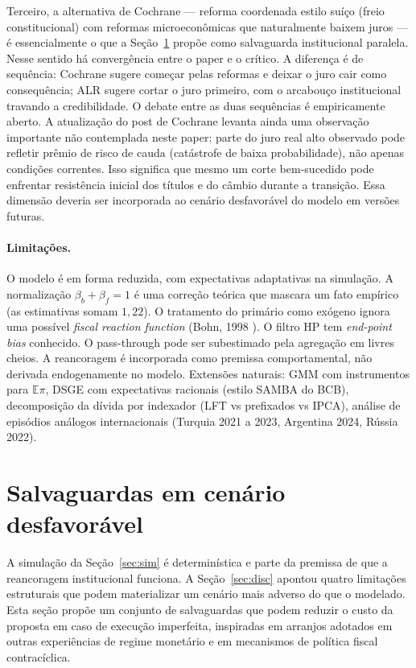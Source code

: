 \documentclass[11pt,a4paper]{article}
\begin{document}
Terceiro, a alternativa de Cochrane — reforma coordenada estilo suíço
(freio constitucional) com reformas microeconômicas que naturalmente
baixem juros — é essencialmente o que a Seção~\ref{sec:salvaguardas}
propõe como salvaguarda institucional paralela. Nesse sentido há
convergência entre o paper e o crítico. A diferença é de sequência:
Cochrane sugere começar pelas reformas e deixar o juro cair como
consequência; ALR sugere cortar o juro primeiro, com o arcabouço
institucional travando a credibilidade. O debate entre as duas
sequências é empiricamente aberto. A atualização do post de Cochrane
levanta ainda uma observação importante não contemplada neste paper:
parte do juro real alto observado pode refletir prêmio de risco de
cauda (catástrofe de baixa probabilidade), não apenas condições
correntes. Isso significa que mesmo um corte bem-sucedido pode enfrentar
resistência inicial dos títulos e do câmbio durante a transição. Essa
dimensão deveria ser incorporada ao cenário desfavorável do modelo em
versões futuras.

\paragraph{Limitações.} O modelo é em forma reduzida, com expectativas
adaptativas na simulação. A normalização $\beta_b + \beta_f = 1$ é
uma correção teórica que mascara um fato empírico (as estimativas somam
$1{,}22$). O tratamento do primário como exógeno ignora uma possível
\emph{fiscal reaction function} (Bohn, 1998 \cite{bohn1998}). O filtro
HP tem \emph{end-point bias} conhecido. O pass-through pode ser
subestimado pela agregação em livres cheios. A reancoragem é incorporada
como premissa comportamental, não derivada endogenamente no modelo.
Extensões naturais: GMM com instrumentos para
$\mathbb{E}\pi$, DSGE com expectativas racionais (estilo SAMBA do BCB),
decomposição da dívida por indexador (LFT vs prefixados vs IPCA),
análise de episódios análogos internacionais (Turquia 2021 a 2023, Argentina
2024, Rússia 2022).

\section{Salvaguardas em cenário desfavorável}\label{sec:salvaguardas}

A simulação da Seção~\ref{sec:sim} é determinística e parte da premissa
de que a reancoragem institucional funciona. A Seção~\ref{sec:disc} apontou quatro
limitações estruturais que podem materializar um cenário mais adverso do
que o modelado. Esta seção propõe um conjunto de salvaguardas que podem
reduzir o custo da proposta em caso de execução imperfeita, inspiradas
em arranjos adotados em outras experiências de regime monetário e em
mecanismos de política fiscal contracíclica.
\end{document}
